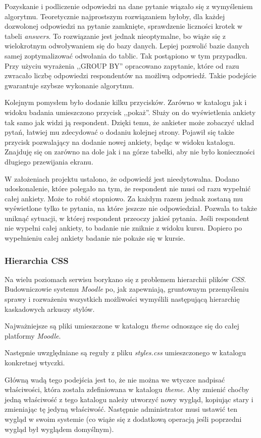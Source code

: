 Pozyskanie i podliczenie odpowiedzi na dane pytanie wiązało się z wymyśleniem algorytmu. Teoretycznie najprostszym rozwiązaniem byłoby, dla każdej dozwolonej odpowiedzi na pytanie zamknięte, sprawdzenie liczności krotek w tabeli \emph{answers}. To rozwiązanie jest jednak nieoptymalne, bo wiąże się z wielokrotnym odwoływaniem się do bazy danych. Lepiej pozwolić bazie danych samej zoptymalizować odwołania do tablic. Tak postąpiono w tym przypadku. Przy użyciu wyrażenia ,,GROUP BY'' opracowano zapytanie, które od razu zwracało liczbę odpowiedzi respondentów na możliwą odpowiedź. Takie podejście gwarantuje szybsze wykonanie algorytmu.

Kolejnym pomysłem było dodanie kilku przycisków. Zarówno w katalogu jak i widoku badania umieszczono przycisk ,,pokaż''. Służy on do wyświetlenia ankiety tak samo jak widzi ją respondent. Dzięki temu, że ankieter może zobaczyć układ pytań, łatwiej mu zdecydować o dodaniu kolejnej strony. Pojawił się także przycisk pozwalający na dodanie nowej ankiety, będąc w widoku katalogu. Znajduję się on zarówno na dole jak i na górze tabelki, aby nie było konieczności długiego przewijania ekranu.

W założeniach projektu ustalono, że odpowiedź jest nieedytowalna. Dodano udoskonalenie, które polegało na tym, że respondent nie musi od razu wypełnić całej ankiety. Może to robić stopniowo. Za każdym razem jednak zostaną mu wyświetlone tylko te pytania, na które jeszcze nie odpowiedział. Pozwala to także uniknąć sytuacji, w której respondent przeoczy jakieś pytania. Jeśli respondent nie wypełni całej ankiety, to badanie nie zniknie z widoku kursu. Dopiero po wypełnieniu całej ankiety badanie nie pokaże się w kursie.

\subsubsection{Hierarchia CSS}
Na wielu poziomach serwisu borykano się z problemem hierarchii plików \emph{CSS}. Budowniczowie systemu \emph{Moodle} po, jak zapewniają, gruntownym przemyśleniu sprawy i rozważeniu wszystkich możliwości wymyślili następującą hierarchię kaskadowych arkuszy stylów.
\begin{description}
\item Najważniejsze są pliki umieszczone w katalogu \emph{theme} odnoszące się do całej platformy \emph{Moodle}.
\item Następnie uwzględniane są reguły z pliku \emph{styles.css} umieszczonego w katalogu konkretnej wtyczki.
\end{description}
Główną wadą tego podejścia jest to, że nie można we wtyczce nadpisać właściwości, która została zdefiniowana w katalogu \emph{theme}. Aby zmienić choćby jedną właściwość z tego katalogu należy utworzyć nowy wygląd, kopiując stary i zmieniając tę jedyną właściwość. Następnie administrator musi ustawić ten wygląd w swoim systemie (co wiąże się z dodatkową operacją jeśli poprzedni wygląd był wyglądem domyślnym).

